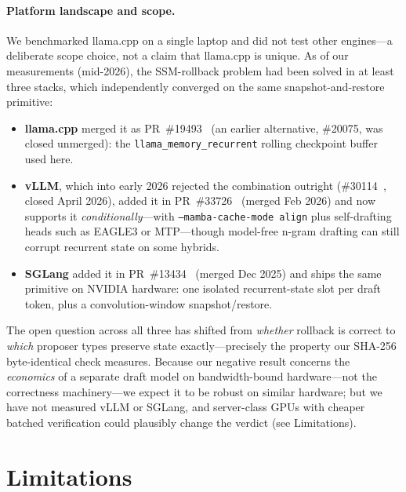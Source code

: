 \documentclass[10pt]{article}
\newcommand{\code}[1]{\texttt{#1}}
\begin{document}
\paragraph{Platform landscape and scope.} We benchmarked llama.cpp on a
single laptop and did not test other engines---a deliberate scope choice, not
a claim that llama.cpp is unique. As of our measurements (mid-2026), the
SSM-rollback problem had been solved in at least three stacks, which
independently converged on the same snapshot-and-restore primitive:
\begin{itemize}
  \item \textbf{llama.cpp} merged it as PR~\#19493~\cite{llamacpppr} (an
    earlier alternative, \#20075, was closed unmerged): the
    \code{llama\_memory\_recurrent} rolling checkpoint buffer used here.
  \item \textbf{vLLM}, which into early 2026 rejected the combination outright
    (\#30114~\cite{vllmissue}, closed April 2026), added it in
    PR~\#33726~\cite{vllmpr} (merged Feb 2026) and now supports it
    \emph{conditionally}---with \code{--mamba-cache-mode align} plus
    self-drafting heads such as EAGLE3 or MTP---though model-free n-gram
    drafting can still corrupt recurrent state on some hybrids.
  \item \textbf{SGLang} added it in PR~\#13434~\cite{sglangpr} (merged Dec
    2025) and ships the same primitive on NVIDIA hardware: one isolated
    recurrent-state slot per draft token, plus a convolution-window
    snapshot/restore.
\end{itemize}
The open question across all three has shifted from \emph{whether} rollback
is correct to \emph{which} proposer types preserve state exactly---precisely
the property our SHA-256 byte-identical check measures. Because our negative
result concerns the \emph{economics} of a separate draft model on
bandwidth-bound hardware---not the correctness machinery---we expect it to be
robust on similar hardware; but we have not measured vLLM or SGLang, and
server-class GPUs with cheaper batched verification could plausibly change
the verdict (see Limitations).

\section{Limitations}
\end{document}
